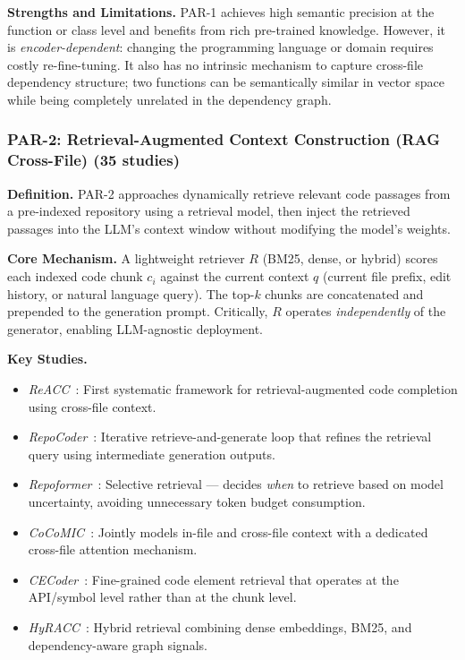 \documentclass[acmsmall,screen,review]{acmart}
\begin{document}
\textbf{Strengths and Limitations.}
PAR-1 achieves high semantic precision at the function or class level
and benefits from rich pre-trained knowledge. However, it is
\emph{encoder-dependent}: changing the programming language or domain
requires costly re-fine-tuning. It also has no intrinsic mechanism to
capture cross-file dependency structure; two functions can be
semantically similar in vector space while being completely unrelated
in the dependency graph.

\subsubsection{PAR-2: Retrieval-Augmented Context Construction
  (RAG Cross-File) (35 studies)}
\label{subsubsec:par2}

\textbf{Definition.} PAR-2 approaches dynamically retrieve relevant
code passages from a pre-indexed repository using a retrieval model,
then inject the retrieved passages into the LLM's context window without
modifying the model's weights.

\textbf{Core Mechanism.} A lightweight retriever $R$ (BM25, dense, or
hybrid) scores each indexed code chunk $c_i$ against the current
context $q$ (current file prefix, edit history, or natural language
query). The top-$k$ chunks are concatenated and prepended to the
generation prompt. Critically, $R$ operates \emph{independently} of
the generator, enabling LLM-agnostic deployment.

\textbf{Key Studies.}
\begin{itemize}
  \item \textit{ReACC}~\cite{Lu2022ReACC}: First systematic framework
    for retrieval-augmented code completion using cross-file context.
  \item \textit{RepoCoder}~\cite{Zhang2023RepoCoder}: Iterative
    retrieve-and-generate loop that refines the retrieval query using
    intermediate generation outputs.
  \item \textit{Repoformer}~\cite{Wu2024Repoformer}: Selective retrieval
    — decides \emph{when} to retrieve based on model uncertainty,
    avoiding unnecessary token budget consumption.
  \item \textit{CoCoMIC}~\cite{Ding2024CoCoMIC}: Jointly models
    in-file and cross-file context with a dedicated cross-file attention
    mechanism.
  \item \textit{CECoder}~\cite{He2025CECoder}: Fine-grained code element
    retrieval that operates at the API/symbol level rather than at the
    chunk level.
  \item \textit{HyRACC}~\cite{Li2025HyRACC}: Hybrid retrieval combining
    dense embeddings, BM25, and dependency-aware graph signals.
\end{itemize}
\end{document}

